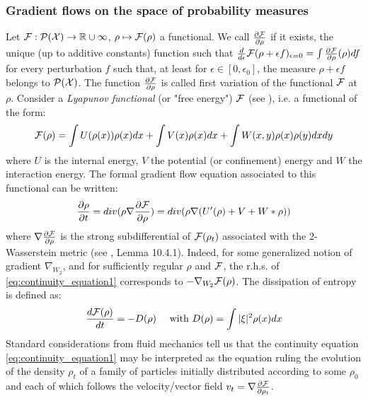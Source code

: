 \subsubsection{Gradient flows on the space of probability measures}\label{sec:gradient_flows_functionals}


Let ${{\mathcal F}} : \mathcal{P}({{\mathcal X}}) \rightarrow {{\mathbb R}} \cup \infty$, $\rho \mapsto {{\mathcal F}}(\rho)$ a functional. We call $\frac{\partial{{{\mathcal F}}}}{\partial{\rho}}$ if it exists, the unique (up to additive constants) function such that $\frac{d}{d\epsilon}{{\mathcal F}}(\rho+\epsilon  f)_{\epsilon=0}=\int\frac{\partial{{{\mathcal F}}}}{\partial{\rho}}(\rho) df$ for every perturbation $f$ such that, at least for $\epsilon \in [0, \epsilon_0]$, the measure $\rho +\epsilon f$ belongs to $\mathcal{P}({{\mathcal X}})$. The function $\frac{\partial{{{\mathcal F}}}}{\partial{\rho}}$ is called first variation of the functional ${{\mathcal F}}$ at $\rho$. Consider a \textit{Lyapunov functional} (or "free energy") ${{\mathcal F}}$ (see \citep{Villani:2004}), i.e. a functional of the form:
\begin{equation}\label{eq:lyapunov}
{{\mathcal F}}(\rho)=\int U(\rho(x)) \rho(x)dx + \int V(x)\rho(x)dx + \int W(x,y)\rho(x)\rho(y)dxdy
\end{equation}
where  $U$ is the internal energy, $V$ the potential (or confinement) energy and $W$ the
interaction energy. The formal gradient flow equation associated to this functional can be written:
\begin{equation}\label{eq:continuity_equation1}
\frac{\partial \rho}{\partial t}= div( \rho \nabla \frac{\partial {{\mathcal F}}}{\partial \rho})=div( \rho \nabla (U'(\rho) + V + W * \rho))
\end{equation}
where $\nabla \frac{\partial {{\mathcal F}}}{\partial \rho}$ is the strong subdifferential of ${{\mathcal F}}(\rho_t)$ associated with the 2-Wasserstein
metric (see \cite{ambrosio2008gradient}, Lemma 10.4.1). Indeed, for some generalized notion of gradient $\nabla_{W_2}$, and for sufficiently regular $\rho$ and ${{\mathcal F}}$, the r.h.s. of \eqref{eq:continuity_equation1} corresponds to $-\nabla_{W_2}{{\mathcal F}}(\rho)$.
The dissipation of entropy is defined as: %
\begin{align}
       \frac{d {{\mathcal F}}(\rho)}{dt} =-D(\rho) \quad \text{ with } D(\rho)= \int |\xi|^2 \rho(x)dx
\end{align}
Standard considerations from fluid mechanics tell us that the continuity equation \eqref{eq:continuity_equation1} may be interpreted as the equation ruling the evolution of the density $\rho_t$ of a family of particles initially distributed according to some $\rho_0$ and each of which follows the velocity/vector field $v_t=\nabla \frac{\partial{{{\mathcal F}}}}{\partial{\rho_t}}$.

